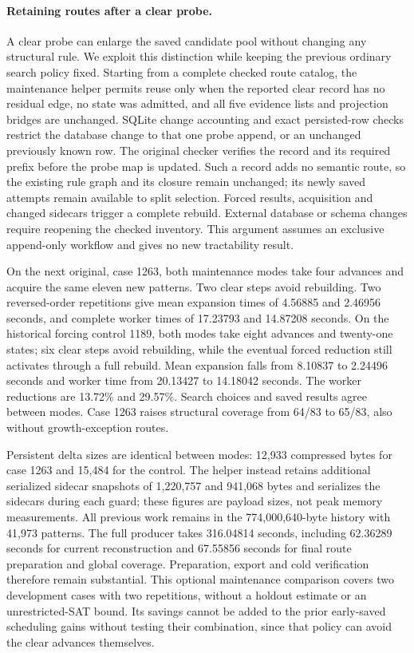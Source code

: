 \documentclass[11pt,a4paper]{article}
\numberwithin{equation}{section}
\theoremstyle{plain}
\theoremstyle{definition}
\theoremstyle{remark}
\begin{document}
\paragraph{Retaining routes after a clear probe.}
A clear probe can enlarge the saved candidate pool without changing any structural rule. We exploit this distinction while keeping the previous ordinary search policy fixed. Starting from a complete checked route catalog, the maintenance helper permits reuse only when the reported clear record has no residual edge, no state was admitted, and all five evidence lists and projection bridges are unchanged. SQLite change accounting and exact persisted-row checks restrict the database change to that one probe append, or an unchanged previously known row. The original checker verifies the record and its required prefix before the probe map is updated. Such a record adds no semantic route, so the existing rule graph and its closure remain unchanged; its newly saved attempts remain available to split selection. Forced results, acquisition and changed sidecars trigger a complete rebuild. External database or schema changes require reopening the checked inventory. This argument assumes an exclusive append-only workflow and gives no new tractability result.

On the next original, case 1263, both maintenance modes take four advances and acquire the same eleven new patterns. Two clear steps avoid rebuilding. Two reversed-order repetitions give mean expansion times of 4.56885 and 2.46956 seconds, and complete worker times of 17.23793 and 14.87208 seconds. On the historical forcing control 1189, both modes take eight advances and twenty-one states; six clear steps avoid rebuilding, while the eventual forced reduction still activates through a full rebuild. Mean expansion falls from 8.10837 to 2.24496 seconds and worker time from 20.13427 to 14.18042 seconds. The worker reductions are 13.72\% and 29.57\%. Search choices and saved results agree between modes. Case 1263 raises structural coverage from 64/83 to 65/83, also without growth-exception routes.

Persistent delta sizes are identical between modes: 12,933 compressed bytes for case 1263 and 15,484 for the control. The helper instead retains additional serialized sidecar snapshots of 1,220,757 and 941,068 bytes and serializes the sidecars during each guard; these figures are payload sizes, not peak memory measurements. All previous work remains in the 774,000,640-byte history with 41,973 patterns. The full producer takes 316.04814 seconds, including 62.36289 seconds for current reconstruction and 67.55856 seconds for final route preparation and global coverage. Preparation, export and cold verification therefore remain substantial. This optional maintenance comparison covers two development cases with two repetitions, without a holdout estimate or an unrestricted-SAT bound. Its savings cannot be added to the prior early-saved scheduling gains without testing their combination, since that policy can avoid the clear advances themselves.
\end{document}
